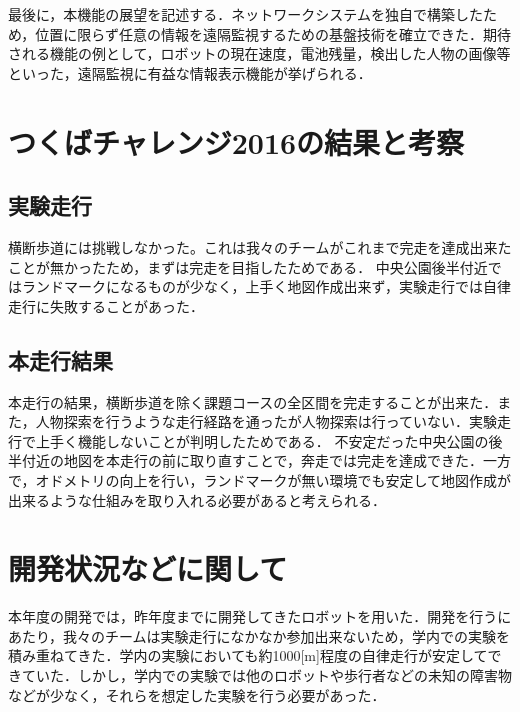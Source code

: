\documentclass[10pt,a4paper]{jarticle}
\begin{document}
最後に，本機能の展望を記述する．ネットワークシステムを独自で構築したため，位置に限らず任意の情報を遠隔監視するための基盤技術を確立できた．期待される機能の例として，ロボットの現在速度，電池残量，検出した人物の画像等といった，遠隔監視に有益な情報表示機能が挙げられる．

\section{つくばチャレンジ2016の結果と考察}
\subsection{実験走行}
横断歩道には挑戦しなかった。これは我々のチームがこれまで完走を達成出来たことが無かったため，まずは完走を目指したためである．
中央公園後半付近ではランドマークになるものが少なく，上手く地図作成出来ず，実験走行では自律走行に失敗することがあった．

\subsection{本走行結果}
本走行の結果，横断歩道を除く課題コースの全区間を完走することが出来た．また，人物探索を行うような走行経路を通ったが人物探索は行っていない．実験走行で上手く機能しないことが判明したためである．
不安定だった中央公園の後半付近の地図を本走行の前に取り直すことで，奔走では完走を達成できた．一方で，オドメトリの向上を行い，ランドマークが無い環境でも安定して地図作成が出来るような仕組みを取り入れる必要があると考えられる．

\section{開発状況などに関して}
本年度の開発では，昨年度までに開発してきたロボットを用いた．開発を行うにあたり，我々のチームは実験走行になかなか参加出来ないため，学内での実験を積み重ねてきた．学内の実験においても約1000[m]程度の自律走行が安定してできていた．しかし，学内での実験では他のロボットや歩行者などの未知の障害物などが少なく，それらを想定した実験を行う必要があった．
\end{document}

